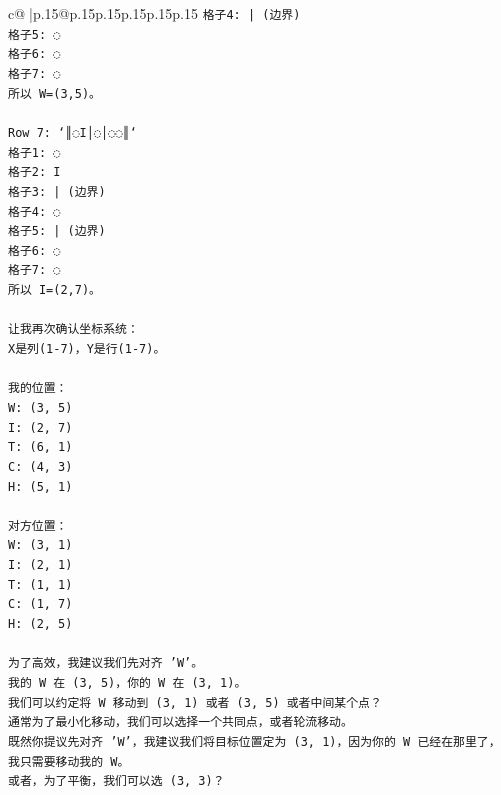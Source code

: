 \documentclass{article}
\begin{document}
{\begin{supertabular}{c@{$\;$}|p{.15\linewidth}@{}p{.15\linewidth}p{.15\linewidth}p{.15\linewidth}p{.15\linewidth}p{.15\linewidth}}
{{{\texttt{格子4: | (边界)} \\
\texttt{格子5: ◌} \\
\texttt{格子6: ◌} \\
\texttt{格子7: ◌} \\
\texttt{所以 W=(3,5)。} \\
\\ 
\texttt{Row 7: `║◌I│◌│◌◌║`} \\
\texttt{格子1: ◌} \\
\texttt{格子2: I} \\
\texttt{格子3: | (边界)} \\
\texttt{格子4: ◌} \\
\texttt{格子5: | (边界)} \\
\texttt{格子6: ◌} \\
\texttt{格子7: ◌} \\
\texttt{所以 I=(2,7)。} \\
\\ 
\texttt{让我再次确认坐标系统：} \\
\texttt{X是列(1{-}7)，Y是行(1{-}7)。} \\
\\ 
\texttt{我的位置：} \\
\texttt{W: (3, 5)} \\
\texttt{I: (2, 7)} \\
\texttt{T: (6, 1)} \\
\texttt{C: (4, 3)} \\
\texttt{H: (5, 1)} \\
\\ 
\texttt{对方位置：} \\
\texttt{W: (3, 1)} \\
\texttt{I: (2, 1)} \\
\texttt{T: (1, 1)} \\
\texttt{C: (1, 7)} \\
\texttt{H: (2, 5)} \\
\\ 
\texttt{为了高效，我建议我们先对齐 'W'。} \\
\texttt{我的 W 在 (3, 5)，你的 W 在 (3, 1)。} \\
\texttt{我们可以约定将 W 移动到 (3, 1) 或者 (3, 5) 或者中间某个点？} \\
\texttt{通常为了最小化移动，我们可以选择一个共同点，或者轮流移动。} \\
\texttt{既然你提议先对齐 'W'，我建议我们将目标位置定为 (3, 1)，因为你的 W 已经在那里了，我只需要移动我的 W。} \\
\texttt{或者，为了平衡，我们可以选 (3, 3)？} \\
}}}
\end{supertabular}}
\end{document}
